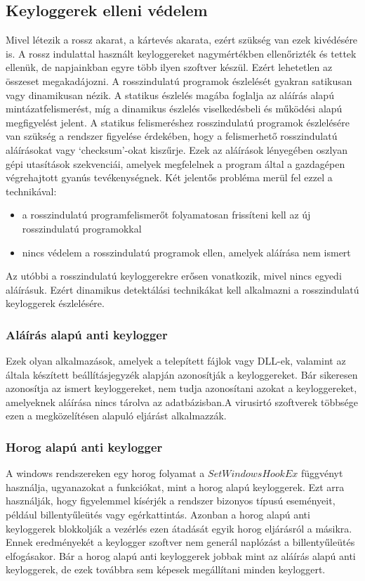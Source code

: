 \documentclass[a4paper, 11pt]{article}
\begin{document}
\subsection{Keyloggerek elleni védelem}
Mivel létezik a rossz akarat, a kártevés akarata, ezért szükség van ezek kivédésére is. A rossz indulattal használt keyloggereket nagymértékben ellenőrizték és tettek ellenük, de napjainkban egyre több ilyen szoftver készül. Ezért lehetetlen az összeset megakadájozni. \cite{wood2010keyloggers} A rosszindulatú programok észlelését gyakran satikusan vagy dinamikusan nézik. A statikus észlelés magába foglalja az aláírás alapú mintázatfelismerést, míg a dinamikus észlelés viselkedésbeli és működési alapú megfigyelést jelent. A statikus felismeréshez rosszindulatú programok észlelésére van szükség a rendszer figyelése érdekében, hogy a felismerhető rosszindulatú aláírásokat vagy `checksum'-okat kiszűrje. Ezek az aláírások lényegében oszlyan gépi utasítások szekvenciái, amelyek megfelelnek a program által a gazdagépen végrehajtott gyanús tevékenységnek. Két jelentős probléma merül fel ezzel a technikával:
\begin{itemize}
\item a rosszindulatú programfelismerőt folyamatosan frissíteni kell az új rosszindulatú programokkal
\item nincs védelem a rosszindulatú programok ellen, amelyek aláírása nem ismert
\end{itemize}
Az utóbbi a rosszindulatú keyloggerekre erősen vonatkozik, mivel nincs egyedi aláírásuk. Ezért dinamikus detektálási technikákat kell alkalmazni a rosszindulatú keyloggerek észlelésére.

\subsubsection{Aláírás alapú anti keylogger}
\cite{tuli2013system} Ezek olyan alkalmazások, amelyek a telepített fájlok vagy DLL-ek, valamint az általa készített beállításjegyzék alapján azonosítják a keyloggereket. Bár sikeresen azonosítja az ismert keyloggereket, nem tudja azonosítani azokat a keyloggereket, amelyeknek aláírása nincs tárolva az adatbázisban.A virusirtó szoftverek többsége ezen a megközelítésen alapuló eljárást alkalmazzák.

\subsubsection{Horog alapú anti keylogger}
\cite{tuli2013system} A windows rendszereken egy horog folyamat a $SetWindowsHookEx$ függvényt használja, ugyanazokat a funkciókat, mint a horog alapú keyloggerek. Ezt arra használják, hogy figyelemmel kísérjék a rendszer bizonyos típusú eseményeit, például billentyűleütés vagy egérkattintás. Azonban a horog alapú anti keyloggerek blokkolják a vezérlés ezen átadását egyik horog eljárásról a másikra. Ennek eredményekét a keylogger szoftver nem generál naplózást a billentyűleütés elfogásakor. Bár a horog alapú anti keyloggerek jobbak mint az aláírás alapú anti keyloggerek, de ezek továbbra sem képesek megállítani minden keyloggert.
\end{document}
